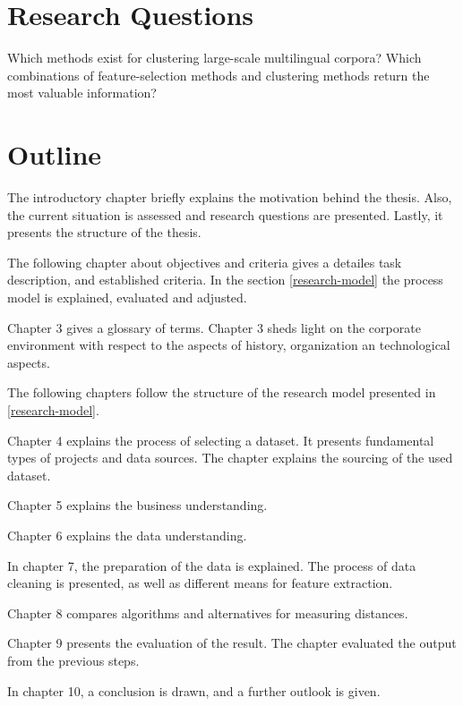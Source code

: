 \section{Research Questions}
Which methods exist for clustering large-scale multilingual corpora? Which combinations of feature-selection methods and clustering methods return the most valuable information?

\section{Outline}
The introductory chapter briefly explains the motivation behind the thesis. Also, the current situation is assessed and research questions are presented. Lastly, it presents the structure of the thesis.

The following chapter about objectives and criteria gives a detailes task description, and established criteria. In the section \ref{research-model} the process model is explained, evaluated and adjusted.

Chapter 3 gives a glossary of terms. Chapter 3 sheds light on the corporate environment with respect to the aspects of history, organization an technological aspects. 

The following chapters follow the structure of the research model presented in \ref{research-model}.

Chapter 4 explains the process of selecting a dataset. It presents fundamental types of projects and data sources. The chapter explains the sourcing of the used dataset.

Chapter 5 explains the business understanding.

Chapter 6 explains the data understanding.

In chapter 7, the preparation of the data is explained. The process of data cleaning is presented, as well as different means for feature extraction.

Chapter 8 compares algorithms and alternatives for measuring distances.

Chapter 9 presents the evaluation of the result. The chapter evaluated the output from the previous steps.

In chapter 10, a conclusion is drawn, and a further outlook is given.